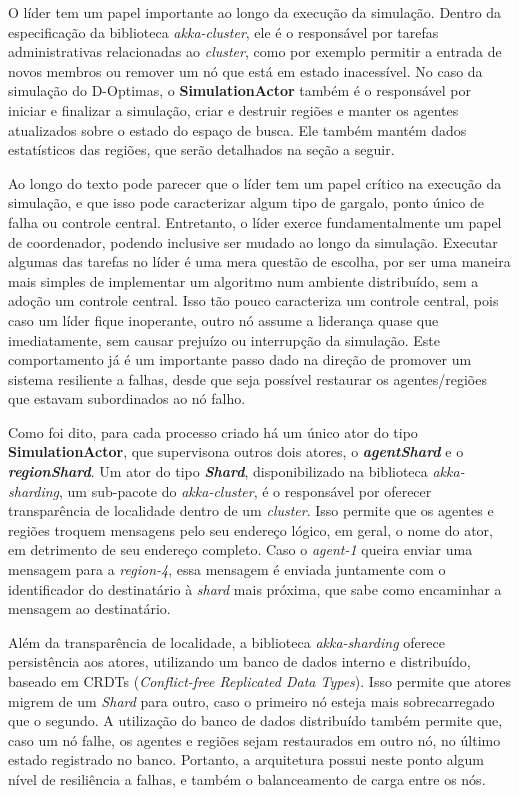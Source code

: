  O líder tem um papel importante ao longo da execução da simulação. Dentro da especificação da biblioteca \textit{akka-cluster}, ele é o responsável por tarefas administrativas relacionadas ao \textit{cluster}, como por exemplo permitir a entrada de novos membros ou remover um nó que está em estado inacessível. No caso da simulação do D-Optimas, o \textbf{SimulationActor} também é o responsável por iniciar e finalizar a simulação, criar e destruir regiões e manter os agentes atualizados sobre o estado do espaço de busca. Ele também mantém dados estatísticos das regiões, que serão detalhados na seção a seguir. 
 
Ao longo do texto pode parecer que o líder tem um papel crítico na execução da simulação, e que isso pode caracterizar algum tipo de gargalo, ponto único de falha ou controle central. Entretanto, o líder exerce fundamentalmente um papel de coordenador, podendo inclusive ser mudado ao longo da simulação. Executar algumas das tarefas no líder é uma mera questão de escolha, por ser uma maneira mais simples de implementar um algoritmo num ambiente distribuído, sem a adoção um controle central. Isso tão pouco caracteriza um controle central, pois caso um líder fique inoperante, outro nó assume a liderança quase que imediatamente, sem causar prejuízo ou interrupção da simulação. Este comportamento já é um importante passo dado na direção de promover um sistema resiliente a falhas, desde  que seja possível restaurar os agentes/regiões que estavam subordinados ao nó falho. 
 
 Como foi dito, para cada processo criado há um único ator do tipo \textbf{SimulationActor}, que supervisona outros dois atores, o \textit{\textbf{agentShard}} e o \textit{\textbf{regionShard}}. Um ator do tipo \textit{\textbf{Shard}}, disponibilizado na biblioteca \textit{akka-sharding}, um sub-pacote do \textit{akka-cluster}, é o responsável por oferecer transparência de localidade dentro de um \textit{cluster}. Isso permite que os agentes e regiões  troquem mensagens pelo seu endereço lógico, em geral, o nome do ator, em detrimento de seu endereço completo. Caso o \textit{agent-1} queira enviar uma mensagem para a \textit{region-4}, essa mensagem é enviada juntamente com o identificador do destinatário à \textit{shard} mais próxima, que sabe como encaminhar a mensagem ao destinatário. 
 
 Além da transparência de localidade, a biblioteca \textit{akka-sharding} oferece persistência aos atores, utilizando um banco de dados interno e distribuído, baseado em CRDTs (\textit{Conflict-free Replicated Data Types})\cite{shapiro2011}. Isso permite que atores migrem de um \textit{Shard} para outro, caso o primeiro nó esteja mais sobrecarregado que o segundo. A utilização do banco de dados distribuído também permite que, caso um nó falhe, os agentes e regiões sejam restaurados em outro nó, no último estado registrado no banco. Portanto, a arquitetura possui neste ponto algum nível de resiliência a falhas, e também o balanceamento de carga entre os nós. 
 

